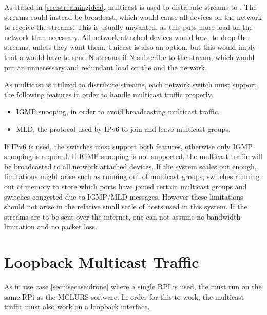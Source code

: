 As stated in \ref{sec:streamingidea}, multicast is used to distribute streams to . The streams could instead be broadcast, which would cause all devices on the network to receive the streams. This is usually unwanted, as this puts more load on the network than necessary. All network attached devices would have to drop the streams, unless they want them. Unicast is also an option, but this would imply that a  would have to send N streams if N  subscribe to the stream, which would put an unnecessary and redundant load on the  and the network.

As multicast is utilized to distribute streams, each network switch must support the following features in order to handle multicast traffic properly.

\begin{itemize}
	 \item IGMP snooping, in order to avoid broadcasting multicast traffic.
	 \item MLD, the protocol used by IPv6 to join and leave multicast groups.
\end{itemize}
If IPv6 is used, the switches most support both features, otherwise only IGMP snooping is required. If IGMP snooping is not supported, the multicast traffic will be broadcasted to all network attached devices.
If the system scales out enough, limitations might arise such as running out of multicast groups, switches running out of memory to store which ports have joined certain multicast groups and switches congested due to IGMP/MLD messages. However these limitations should not arise in the relative small scale of hosts used in this system. If the streams are to be sent over the internet, one can not assume no bandwidth limitation and no packet loss.

\section{Loopback Multicast Traffic} \label{sec:analysis:localmulticasttrafic}
As in use case \ref{sec:usecase:drone} where a single RPI is used, the  must run on the same \ac{RPi} as the \ac{MCLURS} software. In order for this to work, the multicast traffic must also work on a loopback interface.  

